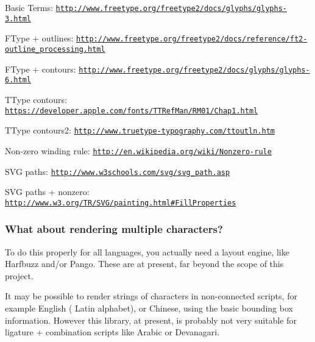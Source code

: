 \begin{DoxyItemize}
\item Basic Terms\+: \href{http://www.freetype.org/freetype2/docs/glyphs/glyphs-3.html}{\tt http\+://www.\+freetype.\+org/freetype2/docs/glyphs/glyphs-\/3.\+html}
\item F\+Type + outlines\+: \href{http://www.freetype.org/freetype2/docs/reference/ft2-outline_processing.html}{\tt http\+://www.\+freetype.\+org/freetype2/docs/reference/ft2-\/outline\+\_\+processing.\+html}
\item F\+Type + contours\+: \href{http://www.freetype.org/freetype2/docs/glyphs/glyphs-6.html}{\tt http\+://www.\+freetype.\+org/freetype2/docs/glyphs/glyphs-\/6.\+html}
\item T\+Type contours\+: \href{https://developer.apple.com/fonts/TTRefMan/RM01/Chap1.html}{\tt https\+://developer.\+apple.\+com/fonts/\+T\+T\+Ref\+Man/\+R\+M01/\+Chap1.\+html}
\item T\+Type contours2\+: \href{http://www.truetype-typography.com/ttoutln.htm}{\tt http\+://www.\+truetype-\/typography.\+com/ttoutln.\+htm}
\item Non-\/zero winding rule\+: \href{http://en.wikipedia.org/wiki/Nonzero-rule}{\tt http\+://en.\+wikipedia.\+org/wiki/\+Nonzero-\/rule}
\item S\+VG paths\+: \href{http://www.w3schools.com/svg/svg_path.asp}{\tt http\+://www.\+w3schools.\+com/svg/svg\+\_\+path.\+asp}
\item S\+VG paths + nonzero\+: \href{http://www.w3.org/TR/SVG/painting.html#FillProperties}{\tt http\+://www.\+w3.\+org/\+T\+R/\+S\+V\+G/painting.\+html\#\+Fill\+Properties}
\end{DoxyItemize}

\subsubsection*{What about rendering multiple characters?}

To do this properly for all languages, you actually need a \textquotesingle{}layout engine\textquotesingle{}, like Harfbuzz and/or Pango. These are at present, far beyond the scope of this project.

It may be possible to render strings of characters in \textquotesingle{}non-\/connected\textquotesingle{} scripts, for example English ( Latin alphabet), or Chinese, using the basic bounding box information. However this library, at present, is probably not very suitable for ligature + combination scripts like Arabic or Devanagari.

